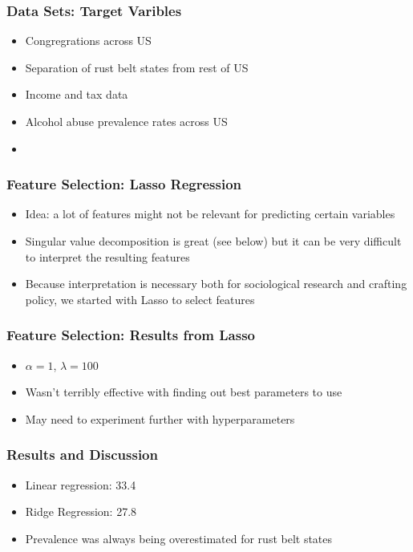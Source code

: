 \documentclass{beamer}
\begin{document}
\begin{frame}

    \frametitle{Data Sets: Target Varibles}

    \uline{}

    \begin{itemize}
      \item Congregrations across US
      \item Separation of rust belt states from rest of US
      \item Income and tax data
      \item Alcohol abuse prevalence rates across US
      \item 
    \end{itemize}

\end{frame}

\begin{frame}

    \frametitle{Feature Selection: Lasso Regression}

    \begin{itemize}
        \item Idea: a lot of features might not be relevant for predicting certain variables
        \item Singular value decomposition is great (see below) but it can be very difficult to interpret the resulting features
        \item Because interpretation is necessary both for sociological research and crafting policy, we started with Lasso to select features
    \end{itemize}

\end{frame}

\begin{frame}

    \frametitle{Feature Selection: Results from Lasso}
    \begin{itemize}
      \item $\alpha = 1$, $\lambda = 100$
      \item Wasn't terribly effective with finding out best parameters to use
      \item May need to experiment further with hyperparameters
    \end{itemize}

\end{frame}


\begin{frame}

  \frametitle{Results and Discussion}
    \begin{itemize}
      \item Linear regression: 33.4%
      \item Ridge Regression: 27.8%
      \item Prevalence was always being overestimated for rust belt states
    \end{itemize}

\end{frame}
\end{document}
